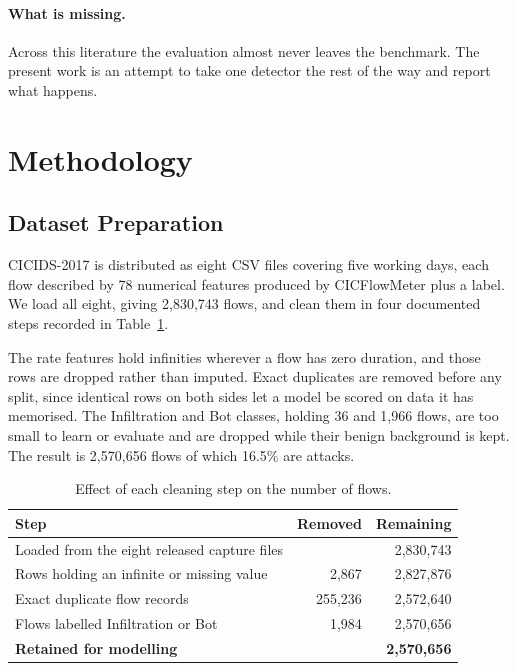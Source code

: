 \documentclass[runningheads]{llncs}
\begin{document}
\paragraph{What is missing.}
Across this literature the evaluation almost never leaves the benchmark. The present work is an attempt to take one detector the rest of the way and report what happens.

\section{Methodology}

\subsection{Dataset Preparation}

CICIDS-2017 is distributed as eight CSV files covering five working days, each flow described by 78 numerical features produced by CICFlowMeter plus a label. We load all eight, giving 2,830,743 flows, and clean them in four documented steps recorded in Table~\ref{tab:cleaning}.

The rate features hold infinities wherever a flow has zero duration, and those rows are dropped rather than imputed. Exact duplicates are removed before any split, since identical rows on both sides let a model be scored on data it has memorised. The Infiltration and Bot classes, holding 36 and 1,966 flows, are too small to learn or evaluate and are dropped while their benign background is kept. The result is 2,570,656 flows of which 16.5\% are attacks.

\begin{table}[t]
\centering
\caption{Effect of each cleaning step on the number of flows.}
\label{tab:cleaning}
\begin{tabular}{lrr}
\toprule
\textbf{Step} & \textbf{Removed} & \textbf{Remaining} \\
\midrule
Loaded from the eight released capture files &         & 2,830,743 \\
Rows holding an infinite or missing value    & 2,867   & 2,827,876 \\
Exact duplicate flow records                 & 255,236 & 2,572,640 \\
Flows labelled Infiltration or Bot           & 1,984   & 2,570,656 \\
\midrule
\textbf{Retained for modelling}              &         & \textbf{2,570,656} \\
\bottomrule
\end{tabular}
\end{table}
\end{document}

